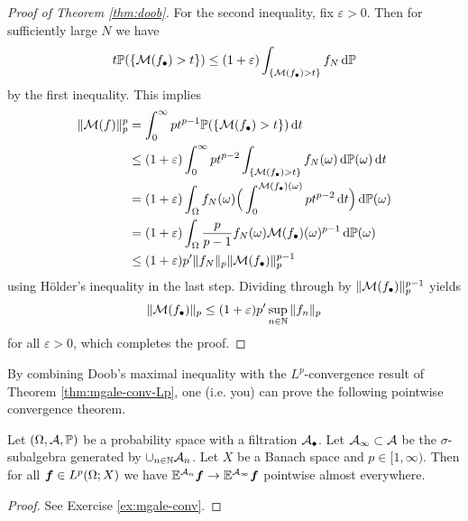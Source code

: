 \begin{proof}[Proof of Theorem \ref{thm:doob}]
  For the second inequality, fix $\varepsilon > 0$.
  Then for sufficiently large $N$ we have
  \begin{equation*}
    t\mathbb{P}(\{\mathcal{M}(f_{\bullet}) > t\}) \leq (1 + \varepsilon) \int_{\{\mathcal{M}(f_{\bullet}) > t\}} f_{N} \, \mathrm{d} \mathbb{P}
  \end{equation*}
  by the first inequality.
  This implies
  \begin{equation*}
    \begin{aligned}
      \|\mathcal{M}(f)\|_{p}^{p}
      &= \int_0^\infty pt^{p-1} \mathbb{P}(\{\mathcal{M}(f_{\bullet}) > t\}) \, \mathrm{d} t \\
      &\leq (1 + \varepsilon) \int_0^\infty pt^{p-2} \int_{\{\mathcal{M}(f_{\bullet}) > t\}} f_{N}(\omega) \, \mathrm{d}\mathbb{P}(\omega) \, \mathrm{d} t \\
      &= (1 + \varepsilon) \int_{\Omega} f_{N}(\omega) \Big( \int_0^{\mathcal{M}(f_{\bullet})(\omega)} pt^{p-2} \, \mathrm{d} t \Big) \, \mathrm{d}\mathbb{P}(\omega) \\
      &= (1 + \varepsilon) \int_{\Omega} \frac{p}{p-1} f_{N}(\omega) \mathcal{M}(f_{\bullet})(\omega)^{p-1} \, \mathrm{d}\mathbb{P}(\omega) \\
      &\leq (1 + \varepsilon) p' \|f_{N}\|_{p} \|\mathcal{M}(f_\bullet)\|_{p}^{p-1}
    \end{aligned}
  \end{equation*}
  using H\"older's inequality in the last step.
  Dividing through by $\|\mathcal{M}(f_{\bullet})\|_{p}^{p-1}$ yields
  \begin{equation*}
    \|\mathcal{M}(f_{\bullet})\|_{p} \leq (1 + \varepsilon) p' \sup_{n \in \mathbb{N}}\|f_{n}\|_{p}
  \end{equation*}
  for all $\varepsilon > 0$, which completes the proof.
\end{proof}

By combining Doob's maximal inequality with the $L^p$-convergence result of Theorem \ref{thm:mgale-conv-Lp}, one (i.e. you) can prove the following pointwise convergence theorem.

\begin{thm}\label{thm:mgale-pw-conv} 
  Let $(\Omega, \mathcal{A}, \mathbb{P})$ be a probability space with a filtration $\mathcal{A}_{\bullet}$.
  Let $\mathcal{A}_{\infty} \subset \mathcal{A}$ be the $\sigma$-subalgebra generated by $\cup_{n \in \mathbb{N}} \mathcal{A}_{n}$.
  Let $X$ be a Banach space and $p \in [1,\infty)$.
  Then for all $\bm{f} \in L^p(\Omega;X)$ we have $\mathbb{E}^{\mathcal{A}_{n}} \bm{f} \to \mathbb{E}^{\mathcal{A}_\infty} \bm{f}$ pointwise almost everywhere.
\end{thm}

\begin{proof}
  See Exercise \ref{ex:mgale-conv}.
\end{proof}

